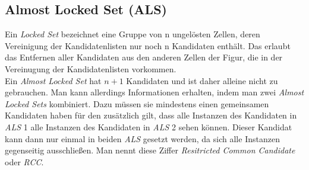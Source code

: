 \newpage
\subsection{Almost Locked Set (ALS)}
Ein \textit{Locked Set} bezeichnet eine Gruppe von n ungelösten Zellen, deren Vereinigung der Kandidatenlisten nur noch n Kandidaten enthält. Das erlaubt das Entfernen aller Kandidaten aus den anderen Zellen der Figur, die in der Vereinugung der Kandidatenlisten vorkommen.\\
Ein \textit{Almost Locked Set} hat $n+1$ Kandidaten und ist daher alleine nicht zu gebrauchen. Man kann allerdings Informationen erhalten, indem man zwei \textit{Almost Locked Sets} kombiniert. Dazu müssen sie mindestens einen gemeinsamen Kandidaten haben für den zusätzlich gilt, dass alle Instanzen des Kandidaten in \textit{ALS} 1 alle Instanzen des Kandidaten in \textit{ALS} 2 sehen können. Dieser Kandidat kann dann nur einmal in beiden \textit{ALS} gesetzt werden, da sich alle Instanzen gegenseitig ausschließen. Man nennt diese Ziffer \textit{Resitricted Common Candidate} oder \textit{RCC}.